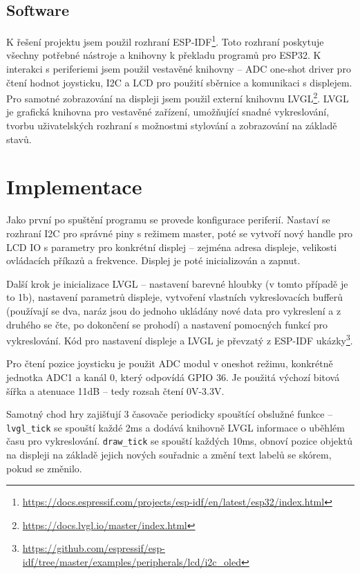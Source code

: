 \documentclass[a4paper, 11pt]{article}
\begin{document}
\subsection{Software}
K řešení projektu jsem použil rozhraní ESP-IDF\footnote{\url{https://docs.espressif.com/projects/esp-idf/en/latest/esp32/index.html}}.
Toto rozhraní poskytuje všechny potřebné nástroje a knihovny k překladu programů pro ESP32.
K interakci s periferiemi jsem použil vestavěné knihovny -- ADC one-shot driver pro čtení hodnot joysticku, I2C a LCD pro použití sběrnice a komunikaci s displejem.
Pro samotné zobrazování na displeji jsem použil externí knihovnu LVGL\footnote{\url{https://docs.lvgl.io/master/index.html}}.
LVGL je grafická knihovna pro vestavěné zařízení, umožňující snadné vykreslování, tvorbu uživatelských rozhraní s možnostmi stylování a zobrazování na základě stavů.

\section{Implementace}
Jako první po spuštění programu se provede konfigurace periferií.
Nastaví se rozhraní I2C pro správné piny s režimem master, poté se vytvoří nový handle pro LCD IO s parametry pro konkrétní displej -- zejména adresa displeje, velikosti ovládacích příkazů a frekvence.
Displej je poté inicializován a zapnut.

Další krok je inicializace LVGL -- nastavení barevné hloubky (v tomto případě je to 1b), nastavení parametrů displeje, vytvoření vlastních vykreslovacích bufferů (používají se dva, naráz jsou do jednoho ukládány nové data pro vykreslení a z druhého se čte, po dokončení se prohodí) a nastavení pomocných funkcí pro vykreslování.
Kód pro nastavení displeje a LVGL je převzatý z ESP-IDF ukázky\footnote{\url{https://github.com/espressif/esp-idf/tree/master/examples/peripherals/lcd/i2c_oled}}.

Pro čtení pozice joysticku je použit ADC modul v oneshot režimu, konkrétně jednotka ADC1 a kanál 0, který odpovídá GPIO 36. Je použitá výchozí bitová šířka a atenuace 11dB -- tedy rozsah čtení 0V-3.3V.

Samotný chod hry zajišťují 3 časovače periodicky spouštící obslužné funkce -- \texttt{lvgl\_tick} se spouští každé 2ms a dodává knihovně LVGL informace o uběhlém času pro vykreslování.
\texttt{draw\_tick} se spouští každých 10ms, obnoví pozice objektů na displeji na základě jejich nových souřadnic a změní text labelů se skórem, pokud se změnilo.
\end{document}
